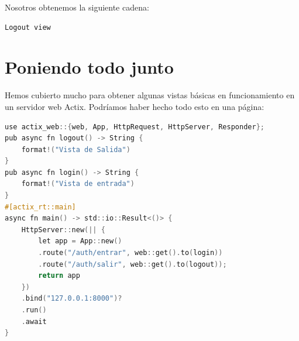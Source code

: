 Nosotros obtenemos la siguiente cadena:

\begin{lstlisting}[language=C]
Logout view
\end{lstlisting}

\section{Poniendo todo junto}

Hemos cubierto mucho para obtener algunas vistas básicas en funcionamiento en un servidor web Actix. Podríamos haber hecho todo esto en una página:

\begin{lstlisting}[language=C]
use actix_web::{web, App, HttpRequest, HttpServer, Responder};
pub async fn logout() -> String {
	format!("Vista de Salida")
}
pub async fn login() -> String {
	format!("Vista de entrada")
}
#[actix_rt::main]
async fn main() -> std::io::Result<()> {
	HttpServer::new(|| {
		let app = App::new()
		.route("/auth/entrar", web::get().to(login))
		.route("/auth/salir", web::get().to(logout));
		return app
	})
	.bind("127.0.0.1:8000")?
	.run()
	.await
}
\end{lstlisting}
